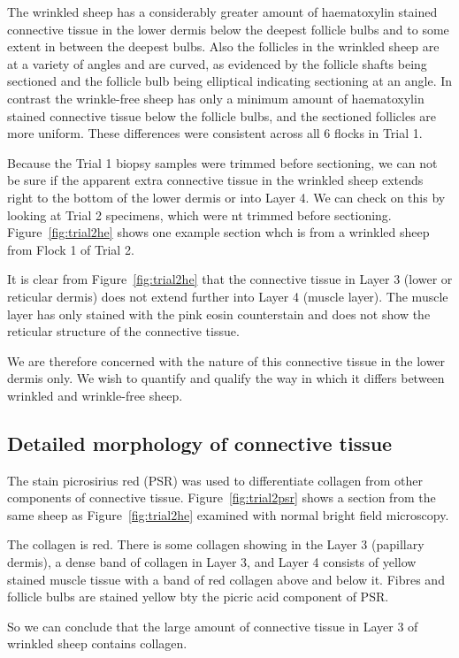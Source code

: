 \documentclass[titlepage]{article}  %
\begin{document}
The wrinkled sheep has a considerably greater amount of haematoxylin stained connective tissue in the lower dermis below the deepest follicle bulbs and to some extent in between the deepest bulbs. Also the follicles in the wrinkled sheep are at a variety of angles and are curved, as evidenced by the follicle shafts being sectioned and the follicle bulb being elliptical indicating sectioning at an angle. In contrast the wrinkle-free sheep has only a minimum amount of haematoxylin stained connective tissue below the follicle bulbs, and the sectioned follicles are more uniform. 
These differences were consistent across all 6 flocks in Trial 1.

Because the Trial 1 biopsy samples were trimmed before sectioning, we can not be sure if the apparent extra connective tissue in the wrinkled sheep extends right to the bottom of the lower dermis or into Layer 4.  We can check on this by looking at Trial 2 specimens, which were nt trimmed before sectioning. Figure~\ref{fig:trial2he} shows one example section whch is from a wrinkled sheep from Flock 1 of Trial 2.


It is clear from Figure~\ref{fig:trial2he} that the connective tissue in Layer 3 (lower or reticular dermis) does not extend further into Layer 4 (muscle layer). The muscle layer has only stained with the pink eosin counterstain and does not show the reticular structure of the connective tissue.

We are therefore concerned with the nature of this connective tissue in the lower dermis only. We wish to quantify and qualify the way in which it differs between wrinkled and wrinkle-free sheep.

\subsection{Detailed morphology of connective tissue} 
The stain picrosirius red (PSR) was used to differentiate collagen from other components of connective tissue. Figure~\ref{fig:trial2psr} shows a section from the same sheep as Figure~\ref{fig:trial2he} examined with normal bright field microscopy. 

The collagen is red. There is some collagen showing in the Layer 3 (papillary dermis), a dense band of collagen in Layer 3, and Layer 4 consists of yellow stained muscle tissue with a band of red collagen above and below it.  Fibres and follicle bulbs are stained yellow bty the picric acid component of PSR.

So we can conclude that the large amount of connective tissue in Layer 3 of wrinkled sheep contains collagen. 
\end{document}
